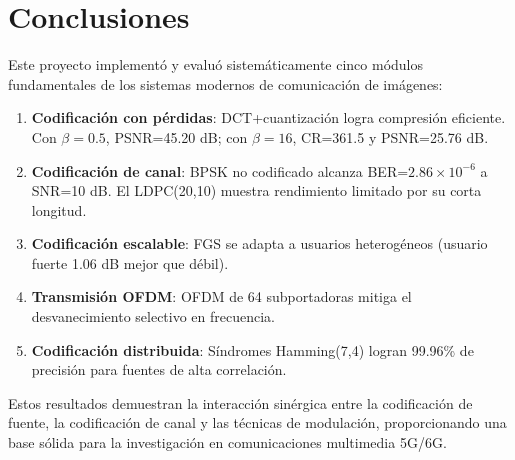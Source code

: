 \documentclass[12pt, a4paper]{article}
\begin{document}
\section{Conclusiones}

Este proyecto implement\'o y evalu\'o sistem\'aticamente cinco m\'odulos fundamentales de los sistemas modernos de comunicaci\'on de im\'agenes:

\begin{enumerate}
    \item \textbf{Codificaci\'on con p\'erdidas}: DCT+cuantizaci\'on logra compresi\'on eficiente. Con $\beta=0.5$, PSNR=45.20 dB; con $\beta=16$, CR=361.5 y PSNR=25.76 dB.
    \item \textbf{Codificaci\'on de canal}: BPSK no codificado alcanza BER=$2.86\times10^{-6}$ a SNR=10 dB. El LDPC(20,10) muestra rendimiento limitado por su corta longitud.
    \item \textbf{Codificaci\'on escalable}: FGS se adapta a usuarios heterog\'eneos (usuario fuerte 1.06 dB mejor que d\'ebil).
    \item \textbf{Transmisi\'on OFDM}: OFDM de 64 subportadoras mitiga el desvanecimiento selectivo en frecuencia.
    \item \textbf{Codificaci\'on distribuida}: S\'indromes Hamming(7,4) logran 99.96\% de precisi\'on para fuentes de alta correlaci\'on.
\end{enumerate}

Estos resultados demuestran la interacci\'on sin\'ergica entre la codificaci\'on de fuente, la codificaci\'on de canal y las t\'ecnicas de modulaci\'on, proporcionando una base s\'olida para la investigaci\'on en comunicaciones multimedia 5G/6G.
\end{document}
